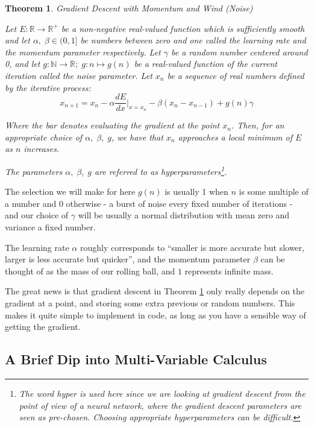 \documentclass[a4paper]{article}
\theoremstyle{plain} %
\newtheorem{theorem}{Theorem}[section]
\theoremstyle{definition} %
\numberwithin{equation}{subsection}
\newcommand{\R}{\mathbb{R}}
\newcommand{\N}{\mathbb{N}}
\begin{document}
\begin{theorem} \label{th:gradient-descent-1d-mom-wind}
  Gradient Descent with Momentum and Wind (Noise)
  
  Let $E:\R \rightarrow \R^+$ be a non-negative real-valued function which is sufficiently smooth
  and let $\alpha, \; \beta \in (0,1]$ be numbers between zero and one called the learning rate and the momentum parameter respectively. 
  Let $\gamma$ be a random number centered around 0, and let $g: \N \rightarrow \R; \; g: n \mapsto g(n)$ be a real-valued function of 
  the current iteration called the noise parameter.
  Let $x_n$ be a sequence of real numbers defined by the iterative process:
  \[ x_{n+1} = x_n - \alpha \frac{dE}{dx}\bigg|_{x=x_n} - \beta (x_{n} - x_{n-1}) + g(n)\gamma \]

  Where the bar denotes evaluating the gradient at the point $x_n$. Then, for an appropriate choice of $\alpha, \; \beta, \; g$,
  we have that $x_n$ approaches a local minimum of $E$ as $n$ increases.

  The parameters $\alpha, \; \beta, \; g$ are referred to as hyperparameters\footnote{The word hyper is used here since we are looking at gradient descent from the point of view of a neural network, where the gradient descent parameters are seen as pre-chosen. Choosing appropriate hyperparameters can be difficult.}.
\end{theorem}

The selection we will make for here $g(n)$ is usually 1 when $n$ is some multiple of a number and 0 otherwise - a burst of noise every fixed number of iterations - and our choice 
of $\gamma$ will be usually a normal distribution with mean zero and variance a fixed number.

The learning rate $\alpha$ roughly corresponds to ``smaller is more accurate but slower, larger is less accurate but quicker'', and the momentum parameter $\beta$ can be thought of as the mass of our rolling ball, and $1$ represents infinite mass.

The great news is that gradient descent in Theorem \ref{th:gradient-descent-1d-mom-wind} only really depends on the gradient at a point, and storing some extra previous or random numbers. 
This makes it quite simple to implement in code, as long as you have a sensible way of getting the gradient.

\subsection{A Brief Dip into Multi-Variable Calculus}
\end{document}

